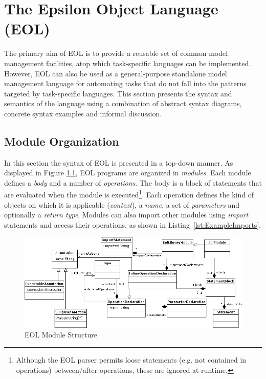 
\chapter{The Epsilon Object Language (EOL)}
\label{sec:Design.EOL}

The primary aim of EOL is to provide a reusable set of common model management facilities, atop which task-specific languages can be implemented. However, EOL can also be used as a general-purpose standalone model management language for automating tasks that do not fall into the patterns targeted by task-specific languages. This section presents the syntax and semantics of the language using a combination of abstract syntax diagrams, concrete syntax examples and informal discussion.

\section{Module Organization}
\label{sec:Design.EOL.Syntax}
\label{sec:Design.EOL.ModuleStucture}

In this section the syntax of EOL is presented in a top-down manner. As displayed in Figure \ref{fig:EOL.Module}, EOL programs are organized in \emph{modules}. Each module defines a \emph{body} and a number of \emph{operations}. The body is a block of statements that are evaluated when the module is executed\footnote{Although the EOL parser permits loose statements (e.g. not contained in operations) between/after operations, these are ignored at runtime.}. Each operation defines the kind of objects on which it is applicable (\emph{context}), a \emph{name}, a set of \emph{parameters} and optionally a \emph{return type}. Modules can also import other modules using \emph{import} statements and access their operations, as shown in Listing~\ref{lst:ExampleImports}.

\begin{figure}
  \centering
  \includegraphics[width=\textwidth,height=\textheight,keepaspectratio]{images/EOLModule.png}
  \caption{EOL Module Structure}
  \label{fig:EOL.Module}
\end{figure}

